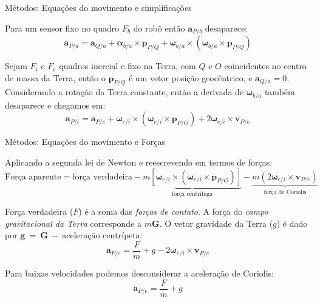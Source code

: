 \documentclass{beamer}
\begin{document}
\begin{frame}{Métodos: Equações do movimento e simplificações}

Para um sensor fixo no quadro \(F_{b}\) do robô então \(\mathbf{a}_{P/b}\) desaparece:
\begin{equation*}
    {\mathbf{a}_{P/a}} = {\mathbf{a}_{Q/a}} + {\mathbf{\alpha}_{b/a}}\!\times\!{\mathbf{p}_{P/Q}} + {\mathbf{\omega}_{b/a}}\!\times\!\left({\mathbf{\omega}_{b/a}}\!\times\!{\mathbf{p}_{P/Q}}\right)
\end{equation*}

Sejam \(F_{i}\)  e  \(F_{e}\) quadros inercial e fixo na Terra, com \(Q\) e \(O\) coincidentes no centro de massa da Terra, então o \(\mathbf{p}_{P/Q}\) é um vetor posição geocêntrico, e \(\mathbf{a}_{Q/a}=0\). Considerando a rotação da Terra constante, então a derivada de \(\mathbf{\omega}_{b/a}\) também desaparece e chegamos em:
\begin{equation} \label{eq:1.5-5}
    {\mathbf{a}_{P/i}} = {\mathbf{a}_{P/e}} + {\mathbf{\omega}_{e/i}}\!\times\!\left({\mathbf{\omega}_{e/i}}\!\times\!{\mathbf{p}_{P/O}}\right) + 2\mathbf{\omega}_{e/i}\!\times\!\mathbf{v}_{P/e}
\end{equation}
\end{frame}

\begin{frame}{Métodos: Equações do movimento e Forças}

Aplicando a segunda lei de Newton e reescrevendo em termos de forças:
\begin{equation*}
    \text{Força aparente} = \text{força verdadeira} - \underbrace{m \left[{\mathbf{\omega}_{e/i}}\!\times\!\left({\mathbf{\omega}_{e/i}}\!\times\!{\mathbf{p}_{P/O}}\right)\right]}_{\text{força centrífuga}} - \underbrace{m \left( 2{\mathbf{\omega}_{e/i}}\!\times\!{\mathbf{v}_{P/e}}\right)}_{\text{força de Coriolis}}
\end{equation*}

Força verdadeira (\(F\)) é a soma das \textit{forças de contato}. A força do \textit{campo gravitacional da Terra} corresponde a \(m\mathbf{G}\). O vetor gravidade da Terra (\(g\)) é dado por \(\mathbf{g}~=~\mathbf{G}~-~\text{aceleração centrípeta}\): 
\begin{equation*}\label{eq:1.5-6}
    \mathbf{a}_{P/e} = \frac{F}{m} + g - {2 \mathbf{\omega}_{e/i}}\!\times\!{\mathbf{v}_{P/e}}
\end{equation*}

Para baixas velocidades podemos desconsiderar a aceleração de Coriolis:
\begin{equation*}
    \mathbf{a}_{P/e} = \frac{F}{m} + g
\end{equation*}


\end{frame}
\end{document}
